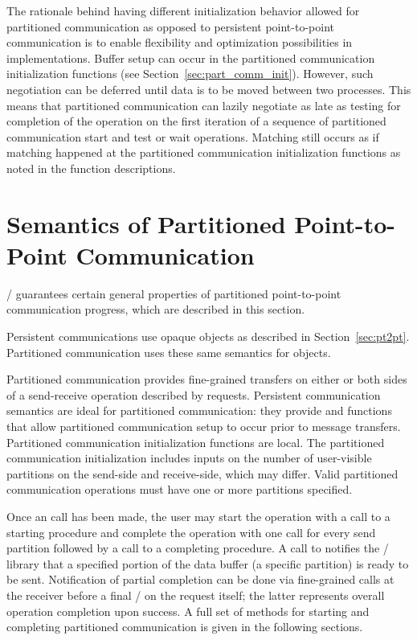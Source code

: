 \begin{rationale}
The rationale behind having different initialization behavior allowed for
partitioned communication as opposed to persistent point-to-point communication is to
enable flexibility and optimization possibilities in implementations.
Buffer setup can occur in the
partitioned communication initialization functions (see Section~\ref{sec:part_comm_init}). 
However, such negotiation can be deferred until
data is to be moved between two processes. This means that partitioned communication can
lazily negotiate as late as testing for completion of the operation on the first
iteration of a sequence of partitioned communication start and test or wait operations.
Matching still occurs as if matching happened at the partitioned communication initialization functions
as noted in the function descriptions.
\end{rationale}

\section{Semantics of Partitioned Point-to-Point Communication}
\label{sec:part-semantics} 
\MPI/ guarantees certain general properties of
partitioned point-to-point communication progress,
which are described in this section.

Persistent communications use opaque  objects
as described in Section~\ref{sec:pt2pt}. Partitioned communication
uses these same semantics for  objects.

Partitioned communication provides fine-grained transfers on either or
both sides of a send-receive operation described by requests.
Persistent communication semantics are ideal for partitioned
communication: they provide  and
 functions that allow partitioned
communication setup to occur prior to message transfers. Partitioned
communication initialization functions are local.  The partitioned
communication initialization includes inputs on the number of
user-visible partitions on the send-side and receive-side, which may
differ.  Valid partitioned communication operations must have
one or more partitions specified.

Once an  call has been made, the user may start the
operation with a call to a starting procedure and complete the
operation with one  call for every
send partition followed by a call to a completing
procedure. A call to  notifies the
\MPI/ library that a specified portion of the data buffer (a specific partition) is ready to be sent.
Notification of partial completion can be done
via fine-grained  calls at the receiver before a final
/ on the request itself; the latter
represents overall operation completion upon success.  
A full set of methods
for starting and completing partitioned communication is given in the
following sections.

